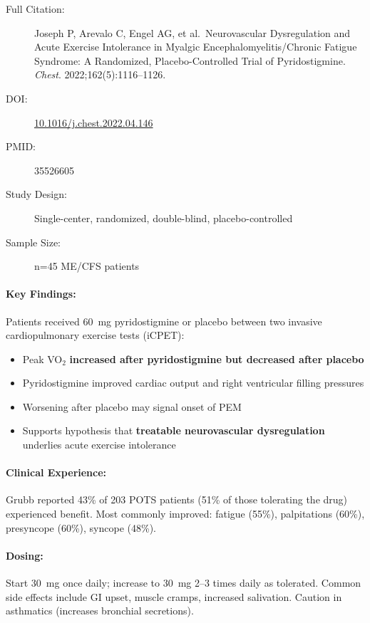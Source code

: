 \begin{description}
    \item[Full Citation:] Joseph P, Arevalo C, Engel AG, et al.\ Neurovascular Dysregulation and Acute Exercise Intolerance in Myalgic Encephalomyelitis/Chronic Fatigue Syndrome: A Randomized, Placebo-Controlled Trial of Pyridostigmine. \textit{Chest}. 2022;162(5):1116--1126.
    \item[DOI:] \href{https://doi.org/10.1016/j.chest.2022.04.146}{10.1016/j.chest.2022.04.146}
    \item[PMID:] 35526605
    \item[Study Design:] Single-center, randomized, double-blind, placebo-controlled
    \item[Sample Size:] n=45 ME/CFS patients
\end{description}

\paragraph{Key Findings:}
Patients received 60~mg pyridostigmine or placebo between two invasive cardiopulmonary exercise tests (iCPET):
\begin{itemize}
    \item Peak VO$_2$ \textbf{increased after pyridostigmine but decreased after placebo}
    \item Pyridostigmine improved cardiac output and right ventricular filling pressures
    \item Worsening after placebo may signal onset of PEM
    \item Supports hypothesis that \textbf{treatable neurovascular dysregulation} underlies acute exercise intolerance
\end{itemize}

\paragraph{Clinical Experience:}
Grubb reported 43\% of 203 POTS patients (51\% of those tolerating the drug) experienced benefit. Most commonly improved: fatigue (55\%), palpitations (60\%), presyncope (60\%), syncope (48\%).

\paragraph{Dosing:}
Start 30~mg once daily; increase to 30~mg 2--3 times daily as tolerated. Common side effects include GI upset, muscle cramps, increased salivation. Caution in asthmatics (increases bronchial secretions).

